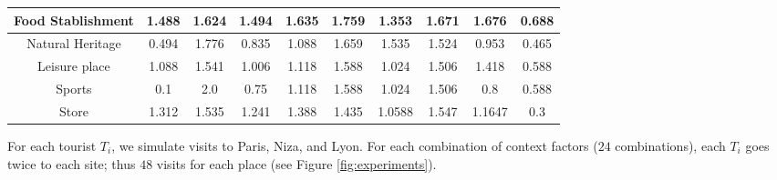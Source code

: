 \begin{table}[h!]
\begin{tabular}{ |c|c|c|c|c|c|c|c|c|c| }
    Food Stablishment &
    1.488  & 1.624 & 1.494  & 1.635  & 1.759 & 1.353 & 1.671 & 1.676  & 0.688  \\ \hline
    
    Natural Heritage &
    0.494  & 1.776 & 0.835  & 1.088  & 1.659 & 1.535  & 1.524 & 0.953 & 0.465 \\ \hline
    
    Leisure place &
    1.088  & 1.541  & 1.006 & 1.118 & 1.588  & 1.024 & 1.506 & 1.418 & 0.588  \\ \hline
    
    Sports &
    0.1 & 2.0 & 0.75 & 1.118 & 1.588  & 1.024 & 1.506 & 0.8 & 0.588  \\ \hline
    
    Store &
    1.312 & 1.535  & 1.241  & 1.388  & 1.435  &1.0588  & 1.547  & 1.1647  & 0.3 \\ \hline


\end{tabular}
\end{table}

For each tourist $T_i$, we simulate visits to Paris, Niza, and Lyon. For each combination of context factors ($24$ combinations),  each $T_i$ goes twice to each site; thus $48$ visits for each place (see Figure \ref{fig:experiments}).



